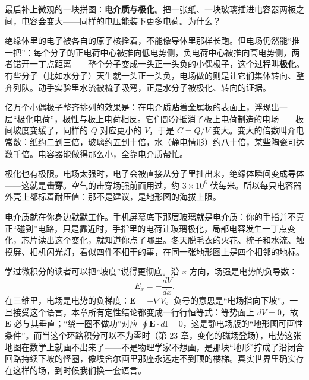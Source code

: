 \begin{mainline}
最后补上微观的一块拼图：\textbf{电介质与极化}。把一张纸、一块玻璃插进电容器两板之间，电容会变大——同样的电压能装下更多电荷。为什么？

绝缘体里的电子被各自的原子核拴着，不能像导体里那样长跑。但电场仍然能“推一把”：每个分子的正电荷中心被推向低电势侧，负电荷中心被推向高电势侧，两者错开一丁点距离——整个分子变成一头正一头负的小偶极子，这个过程叫\textbf{极化}。有些分子（比如水分子）天生就一头正一头负，电场做的则是让它们集体转向、整齐列队。动手实验里水流被梳子吸弯，正是水分子被极化、转向的证据。

亿万个小偶极子整齐排列的效果是：在电介质贴着金属板的表面上，浮现出一层“极化电荷”，极性与板上电荷相反。它们部分抵消了板上电荷制造的电场——板间坡度变缓了，同样的 \(Q\) 对应更小的 \(V\)，于是 \(C=Q/V\) 变大。变大的倍数叫介电常数：纸约二到三倍，玻璃约五到十倍，水（静电情形）约八十倍，某些陶瓷可达数千倍。电容器能做得那么小，全靠电介质帮忙。

极化也有极限。电场太强时，电子会被直接从分子里扯出来，绝缘体瞬间变成导体——这就是\textbf{击穿}。空气的击穿场强前面用过，约 \(3\times10^{6}\) 伏每米。所以每只电容器外壳上都标着耐压值：那不是建议，是地形图的海拔上限。

电介质就在你身边默默工作。手机屏幕底下那层玻璃就是电介质：你的手指并不真正“碰到”电路，只是靠近时，手指里的电荷让玻璃极化，局部电容发生一丁点变化，芯片读出这个变化，就知道你点了哪里。冬天脱毛衣的火花、梳子和水流、触摸屏、相机闪光灯，看似四件不相干的事，在同一张地形图上是四个相邻的地标。
\end{mainline}

\begin{challenge}
学过微积分的读者可以把“坡度”说得更彻底。沿 \(x\) 方向，场强是电势的负导数：
\[
E_x = -\frac{dV}{dx}.
\]
在三维里，电场是电势的负梯度：\(\mathbf{E} = -\nabla V\)。负号的意思是“电场指向下坡”。一旦接受这个语言，本章所有定性结论都变成一行行恒等式：等势面上 \(dV=0\)，故 \(\mathbf{E}\) 必与其垂直；“绕一圈不做功”对应 \(\oint \mathbf{E}\cdot d\mathbf{l}=0\)，这是静电场版的“地形图可画性条件”。而当这个环路积分可以不为零时（第 23 章，变化的磁场登场），电势这张地图在数学上就画不出来了——不是物理学家不想画，是那块“地形”拧成了沿闭合回路持续下坡的怪圈，像埃舍尔画里那座永远走不到顶的楼梯。真实世界里确实存在这样的场，到时候我们换一套语言。
\end{challenge}


